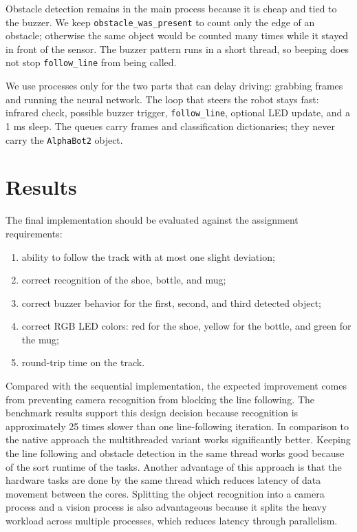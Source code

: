 \documentclass{article}
\begin{document}
Obstacle detection remains in the main process because it is cheap and tied to the buzzer. We keep \texttt{obstacle\_was\_present} to count only the edge of an obstacle; otherwise the same object would be counted many times while it stayed in front of the sensor. The buzzer pattern runs in a short thread, so beeping does not stop \texttt{follow\_line} from being called.

We use processes only for the two parts that can delay driving: grabbing frames and running the neural network. The loop that steers the robot stays fast: infrared check, possible buzzer trigger, \texttt{follow\_line}, optional LED update, and a 1 ms sleep. The queues carry frames and classification dictionaries; they never carry the \texttt{AlphaBot2} object.

\section{Results }

The final implementation should be evaluated against the assignment requirements:
\begin{enumerate}
    \item ability to follow the track with at most one slight deviation;
    \item correct recognition of the shoe, bottle, and mug;
    \item correct buzzer behavior for the first, second, and third detected object;
    \item correct RGB LED colors: red for the shoe, yellow for the bottle, and green for the mug;
    \item round-trip time on the track.
\end{enumerate}

Compared with the sequential implementation, the expected improvement comes from preventing camera recognition from blocking the  line following. The benchmark results support this design decision because recognition is approximately 25 times slower than one line-following iteration. In comparison to the native approach the multithreaded variant works significantly better. Keeping the line following and obstacle detection in the same thread works good because of the sort runtime of the tasks. Another advantage of this approach is that the hardware tasks are done by the same thread which reduces latency of data movement between the cores. Splitting the object recognition into a camera process and a vision process is also advantageous because it splits the heavy workload across multiple processes, which reduces latency through parallelism.
\end{document}
